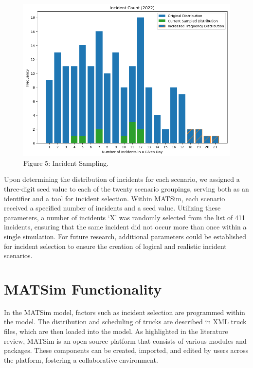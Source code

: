 \documentclass[fancy, oneside, mastersfancy, ms]{byuthesis}
\begin{document}
\begin{figure}

{\centering \includegraphics{figures/inc_sampling.png}

}

\caption{\label{fig-Inc_Map}Figure 5: Incident Sampling.}

\end{figure}

Upon determining the distribution of incidents for each scenario, we
assigned a three-digit seed value to each of the twenty scenario
groupings, serving both as an identifier and a tool for incident
selection. Within MATSim, each scenario received a specified number of
incidents and a seed value. Utilizing these parameters, a number of
incidents `X' was randomly selected from the list of 411 incidents,
ensuring that the same incident did not occur more than once within a
single simulation. For future research, additional parameters could be
established for incident selection to ensure the creation of logical and
realistic incident scenarios.

\hypertarget{matsim-functionality}{%
\section{MATSim Functionality}\label{matsim-functionality}}

In the MATSim model, factors such as incident selection are programmed
within the model. The distribution and scheduling of trucks are
described in XML truck files, which are then loaded into the model. As
highlighted in the literature review, MATSim is an open-source platform
that consists of various modules and packages. These components can be
created, imported, and edited by users across the platform, fostering a
collaborative environment.
\end{document}
